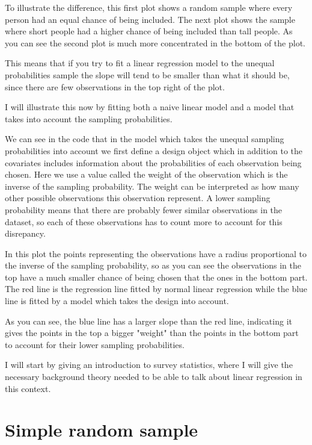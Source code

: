 \documentclass{article}
\begin{document}
To illustrate the difference, this first plot shows a random sample where every person had an equal chance of being included. The next plot shows the sample where short people had a higher chance of being included than tall people. As you can see the second plot is much more concentrated in the bottom of the plot.



This means that if you try to fit a linear regression model to the unequal probabilities sample the slope will tend to be smaller than what it should be, since there are few observations in the top right of the plot.

I will illustrate this now by fitting both a naive linear model and a model that takes into account the sampling probabilities.



We can see in the code that in the model which takes the unequal sampling probabilities into account we first define a design object which in addition to the covariates includes information about the probabilities of each observation being chosen. Here we use a value called the weight of the observation which is the inverse of the sampling probability. The weight can be interpreted as how many other possible observations this observation represent. A lower sampling probability means that there are probably fewer similar observations in the dataset, so each of these observations has to count more to account for this disrepancy.

In this plot the points representing the observations have a radius proportional to the inverse of the sampling probability, so as you can see the observations in the top have a much smaller chance of being chosen that the ones in the bottom part. The red line is the regression line fitted by normal linear regression while the blue line is fitted by a model which takes the design into account. 

As you can see, the blue line has a larger slope than the red line, indicating it gives the points in the top a bigger "weight" than the points in the bottom part to account for their lower sampling probabilities.


I will start by giving an introduction to survey statistics, where I will give the necessary background theory needed to be able to talk about linear regression in this context.

\section{Simple random sample}
\end{document}
